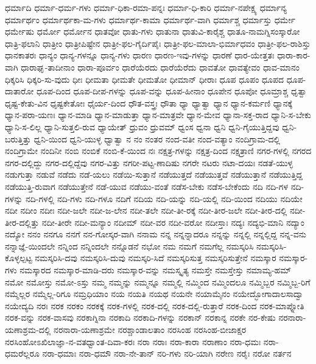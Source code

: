 {ಧರ್ಮಾದಿ
ಧರ್ಮಾ-ಧರ್ಮ-ಗಳು
ಧರ್ಮಾ-ಧಿಕಾ-ರಮಾ-ಪನ್ನಃ
ಧರ್ಮಾ-ಧಿ-ಕಾರಿ
ಧರ್ಮಾ-ನಪೇಕ್ಷ್ಯ
ಧರ್ಮಾನ್ಯ
ಧರ್ಮಾರ್ಥಂ
ಧರ್ಮಾರ್ಥಕಾ-ಮ-ಗಳು
ಧರ್ಮಾರ್ಥ-ಕಾಮಾ
ಧರ್ಮಾರ್ಥ-ವಾಗಿ
ಧರ್ಮಾಶ್ಚ
ಧರ್ಮಾಸ್ತು
ಧರ್ಮೇ
ಧರ್ಮೇಷು
ಧರ್ಮೋ
ಧರ್ಮೋನ
ಧಾತವೋ
ಧಾತು-ಗಳು
ಧಾತುನಾ
ಧಾತುವಿ-ಕಾರೈಶ್ಚ
ಧಾತೂ-ನಾಮಗ್ನಿಸಂಸ್ಕಾರೋ
ಧಾತ್ರಿ-ಫಲಾನಿ
ಧಾತ್ರೀಂ
ಧಾತ್ರೀಪಿಷ್ಟೇನ
ಧಾತ್ರೀ-ಫಲ-ಗೈರ್ದಿಪೈಃ
ಧಾತ್ರೀ-ಫಲ-ಮಾಲಾ-ಭಿರ್ಮಾಧವಂ
ಧಾತ್ರೀ-ಫಲ-ರಾಶಿಸ್ತು
ಧಾನಕಾತರಃ
ಧಾನ್ಯಂ
ಧಾನ್ಯ-ಗಳನ್ನೂ
ಧಾನ್ಯ-ಗಳು
ಧಾರಣ
ಧಾರಣ-ಇವು-ಗಳನ್ನು
ಧಾರಣೆ
ಧಾರ-ಯೇತ್ತತಃ
ಧಾರಾ-ಕಾರ-ವಾಗಿ
ಧಾರಾಘೃ-ತಾದೀನಾಂ
ಧಾರಾ-ಪೂರ್ವಂ
ಧಾರೆಯೆರದು
ಧಾರೆಯೆರೆದು
ಧಾವತೋ
ಧಾವತ್ಯೇವಂ
ಧಾವ-ಮಾನಂ
ಧಿಕ್ಕರಿಸಿ
ಧಿಕ್ಕರಿ-ಸು-ವುದು
ಧೀಃ
ಧೀಮತಾ
ಧೀಮತೇ
ಧೀಮತೋ
ಧೀಮಾನ್
ಧೀರಾಃ
ಧೂಪ
ಧೂಪಂ
ಧೂಪದ
ಧೂಪ-ದಾತಾರೋ
ಧೂಪ-ದಿಂದ
ಧೂಪ-ದೀಪ-ಗಳನ್ನು
ಧೂಪ-ವನ್ನು
ಧೂಪ-ಹೀನಾಂ
ಧೂಪೇನ
ಧೂಪೋ
ಧೂಮ್ರಾಶ್ಚ
ಧೃತ್ವಾ
ಧೃಷ್ಟ-ಕೇತು-ವಿನ
ಧೃಷ್ಟಕೇತೋಃ
ಧೈರ್ಯ-ದಿಂದ
ಧೌತ-ವಸ್ತ್ರಃ
ಧೌತಾ
ಧ್ಯಾ
ಧ್ಯಾತ್ವಾ
ಧ್ಯಾನ
ಧ್ಯಾನ-ಕರ್ಮಣಿ
ಧ್ಯಾನಕ್ಕೆ
ಧ್ಯಾನ-ಪರಾ-ಯಣಃ
ಧ್ಯಾನ-ಮಾಡಿ
ಧ್ಯಾನ-ಮಾಡುತ್ತಾ
ಧ್ಯಾನ-ಮಾತ್ರವೇ
ಧ್ಯಾನ-ಮೇವ
ಧ್ಯಾನಾ-ಸಕ್ತ-ರಾದ
ಧ್ಯಾನಿ-ಸ-ಬೇಕು
ಧ್ಯಾನಿ-ಸ-ಲಿಲ್ಲ
ಧ್ಯಾನಿ-ಸುತ್ತಲಿ-ರುವ
ಧ್ಯಾಯೇತ್
ಧ್ರುವಂ
ಧ್ರುವಮ್
ಧ್ವಂಸ
ಧ್ವನಾ
ಧ್ವನಿ
ಧ್ವನಿ-ಗೈಯುತ್ತಿದ್ದವು
ಧ್ವನಿ-ಬರುತ್ತಿತ್ತು
ಧ್ವನಿ-ಯಿಂದ
ಧ್ವನಿ-ಯುಳ್ಳ
ಧ್ವಾತ್ವಾ
ನ
ನಂ
ನಂತರ
ನಂದ-ವತೀ
ನಂದ-ವತ್ಯಾಂ
ನಂದಿಗ್ರಾಮ-ದಲ್ಲಿ
ನಂದಿಗ್ರಾಮೇ
ನಂದಿನೀ
ನಂಬಿ
ನಂಬಿಕೆ
ನಂಬಿ-ಕೆ-ಯಿಂದ
ನಃ
ನಕ್ಷತ್ರ-ಗಳನ್ನು
ನಕ್ಷತ್ರ-ದಿಂದ
ನಕ್ಷತ್ರಾಣಿ
ನಗರ-ಗಳಲ್ಲಿ
ನಗರದ
ನಗರ-ದಲ್ಲಿದ್ದು
ನಗರ-ದಲ್ಲಿದ್ದೆವು
ನಗರ-ವಿತ್ತು
ನಗರೀ-ಪಟ್ಟ-ಣಾದಿಷು
ನಗರೇ
ನಟರು
ನಟಾ-ದಯಃ
ನಡತೆ-ಯುಳ್ಳ
ನಡುಗುತ್ತಾ
ನಡುವೆ
ನಡೆದು
ನಡೆ-ಯಲು
ನಡೆಯಿ-ಸುತ್ತಾನೆ
ನಡೆಯುತ್ತದೆ
ನಡೆಯುತ್ತವೆ
ನಡೆಯುತ್ತಾನೆ
ನಡೆಯುತ್ತಿದ್ದ
ನಡೆಯುತ್ತಿ-ರುವಾಗ
ನಡೆಯುತ್ತೇನೆ
ನಡೆ-ಯುವ
ನಡೆಯು-ವಂತೆ
ನಡೆಸ-ಬೇಕು
ನಡೆಸ-ಬೇಕೆಂದು
ನದಿ
ನದಿ-ಗಳ
ನದಿ-ಗಳನ್ನು
ನದಿ-ಗಳಲ್ಲಿ
ನದಿ-ಗಳು
ನದಿ-ಗಳೂ
ನದಿಗೆ
ನದಿಯ
ನದಿ-ಯನ್ನು
ನದಿ-ಯಲ್ಲಿ
ನದಿ-ಯಿಂದ
ನದಿಯು
ನದಿಯೇ
ನದೀ
ನದೀಂ
ನದೀಃ
ನದೀ-ಜಲೇ
ನದೀ-ಜ-ಲೇನ
ನದೀ-ತಲೇ
ನದೀ-ತೀ-ರಕ್ಕೆ
ನದೀ-ತೀರ-ಜಲೇ
ನದೀ-ತೀರ-ದಲ್ಲಿ
ನದೀ-ತೀರ-ದಲ್ಲಿತ್ತು
ನದೀ-ತೀರೇ
ನದೀ-ಮನ್ಯಾಂ
ನದೀಮ್
ನದೀ-ವರ
ನದೀ-ವರೋ
ನದೀಸ್ತಾಃ
ನದ್ಯಃ
ನದ್ಯಭಿ-ಮಾನಿ
ನದ್ಯಾಂ
ನದ್ಯೋ
ನನಂ
ನನಗೂ
ನನಗೆ
ನನ-ಗೋಸ್ಕರ-ವಾಗಿ
ನನಾಮ
ನನ್ನ
ನನ್ನನ್ನಾದರೂ
ನನ್ನನ್ನು
ನನ್ನಲ್ಲಿ
ನನ್ನಲ್ಲಿದ್ದ
ನನ್ನ-ವನು
ನನ್ನಾಜ್ಞೆ-ಯಿಂದಲೇ
ನನ್ನಿಂದ
ನನ್ನಿಂದಲೇ
ನನ್ನೊಡನೆ
ನಭೋ
ನಮ
ನಮಗೆ
ನಮಗೆಲ್ಲ
ನಮಸ್ಕರಿಸಿ
ನಮಸ್ಕರಿಸಿ-ಕೊಳ್ಳಲ್ಪಟ್ಟ
ನಮಸ್ಕರಿಸಿ-ದವು
ನಮಸ್ಕರಿಸಿ-ದುವು
ನಮಸ್ಕರಿ-ಸಿದೆ
ನಮಸ್ಕರಿಸುತ್ತ
ನಮಸ್ಕರಿಸುತ್ತೇನೆ
ನಮಸ್ಕಾರ
ನಮಸ್ಕಾರ-ಗಳು
ನಮಸ್ಕಾರದ
ನಮಸ್ಕಾರ-ಮಾಡಿ-ದರು
ನಮಸ್ಕಾರ-ವನ್ನು
ನಮಸ್ಕೃತ್ಯ
ನಮಸ್ತೇ
ನಮಸ್ತೇಸ್ತು
ನಮಾಮ್ಯ-ಹಮ್
ನಮೋ
ನಮೋಸ್ತು
ನಮೋ-ಽಸ್ತು
ನಮ್ಮ
ನಮ್ಮನ್ನು
ನಮ್ಮನ್ನೂ
ನಮ್ಮಲ್ಲಿ
ನಮ್ಮಿಂದ
ನಮ್ಮಿಂದಲೂ
ನಮ್ಮಿಬ್ಬರ
ನಮ್ಮಿಬ್ಬ-ರಿಗೆ
ನಮ್ಮೆಲ್ಲರ
ನಮ್ಮೆಲ್ಲ-ರಿಗೂ
ನಮ್ರಧಿಯಾಂ
ನಯ
ನಯತಿ
ನಯಥ
ನಯನೇ
ನಯಾಮೈನಂ
ನಯೇದ್ಭೋಗಾದಾಲಸಾದ್ವಾ
ನಯೇದ್ಯದಿ
ನರಃ
ನರಕ
ನರಕಂ
ನರಕಕ್ಕೆ
ನರಕ-ಗಳಲ್ಲಿ
ನರಕ-ದಲ್ಲಿ
ನರಕ-ದಲ್ಲಿ-ರುತ್ತಾರೆ
ನರಕ-ದಿಂದ
ನರಕ-ಮಾಪ್ನೋತಿ
ನರಕ-ವನ್ನು
ನರಕ-ವಾಸವು
ನರಕಾಗ್ನಿನಾ
ನರಕಾದಿ
ನರಕಾದಿ-ಗಳನ್ನು
ನರಕಾನ್
ನರಕಾನ್ನ
ನರಕೇ
ನರ-ಕೇಷು
ನರನಾರಾ-ಯಣಾಶ್ರಮ-ದಲ್ಲಿ
ನರನಾರಾ-ಯಣಾಶ್ರಮೇ
ನರಶ್ಚಾಂಡಾಲತಾಂ
ನರಸಿಂಹ
ನರಸಿಂಹ-ಬೀಜಾಕ್ಷರ
ನರಸಿಂಹೋಽಖಿಲಾಜ್ಞಾ-ನ-ವತಧ್ವಾಂತ-ದಿವಾ-ಕರಃ
ನರಾ
ನರಾಃ
ನರಾ-ಕಾರಾ
ನರಾಣಾಂ
ನರಾ-ಧಮಃ
ನರಾ-ಧಮರೆಲ್ಲರೂ
ನರಾ-ಧಮಾಃ
ನರಾ-ಧಮೌ
ನರಾ-ನೇ-ತಾನ್
ನರಿ-ಗಳು
ನರಿ-ಯಾಗಿ
ನರೇಣ
ನರೈಃ
ನರೋ
ನರ್ತನ
}
